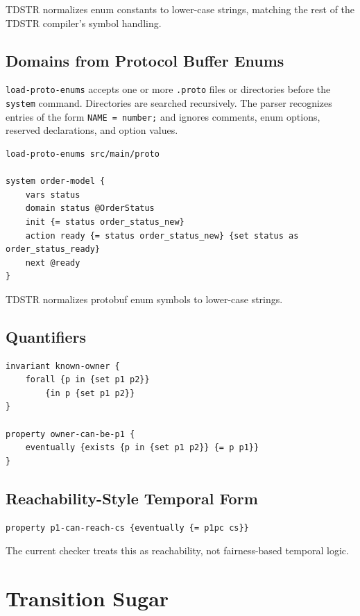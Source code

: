\documentclass[11pt]{article}
\begin{document}
TDSTR normalizes enum constants to lower-case strings, matching the rest of the
TDSTR compiler's symbol handling.

\subsection{Domains from Protocol Buffer Enums}

\texttt{load-proto-enums} accepts one or more \texttt{.proto} files or
directories before the \texttt{system} command.  Directories are searched
recursively.  The parser recognizes entries of the form \texttt{NAME = number;}
and ignores comments, enum options, reserved declarations, and option values.

\begin{lstlisting}[language=TDSTR]
load-proto-enums src/main/proto

system order-model {
    vars status
    domain status @OrderStatus
    init {= status order_status_new}
    action ready {= status order_status_new} {set status as order_status_ready}
    next @ready
}
\end{lstlisting}

TDSTR normalizes protobuf enum symbols to lower-case strings.

\subsection{Quantifiers}

\begin{lstlisting}[language=TDSTR]
invariant known-owner {
    forall {p in {set p1 p2}}
        {in p {set p1 p2}}
}

property owner-can-be-p1 {
    eventually {exists {p in {set p1 p2}} {= p p1}}
}
\end{lstlisting}

\subsection{Reachability-Style Temporal Form}

\begin{lstlisting}[language=TDSTR]
property p1-can-reach-cs {eventually {= p1pc cs}}
\end{lstlisting}

The current checker treats this as reachability, not fairness-based temporal
logic.

\section{Transition Sugar}
\end{document}
